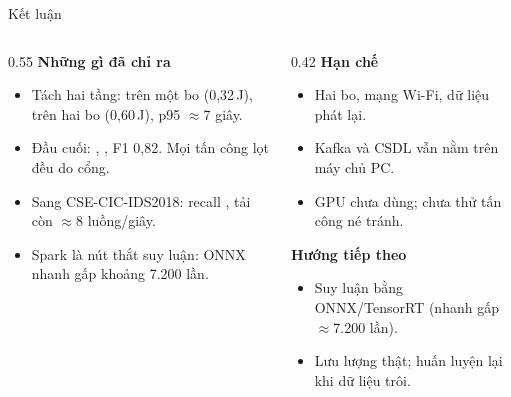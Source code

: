 \documentclass[aspectratio=169, 11pt]{beamer}
\begin{document}
\begin{frame}{Kết luận}
  \begin{columns}[T]
    \begin{column}{0.55\textwidth}
      \textbf{Những gì đã chỉ ra}
      \begin{itemize}\small
        \setlength{\itemsep}{0.3em}
        \item Tách hai tầng:  trên một bo
              (0,32\,J),  trên hai bo (0,60\,J), p95 $\approx$7 giây.
        \item Đầu cuối: , , F1 0,82.
              Mọi tấn công lọt đều do cổng.
        \item Sang CSE-CIC-IDS2018: recall , tải còn $\approx$8 luồng/giây.
        \item Spark là nút thắt suy luận: ONNX nhanh gấp khoảng 7.200 lần.
      \end{itemize}
    \end{column}
    \begin{column}{0.42\textwidth}
      \textbf{Hạn chế}
      \begin{itemize}\footnotesize
        \item Hai bo, mạng Wi-Fi, dữ liệu phát lại.
        \item Kafka và CSDL vẫn nằm trên máy chủ PC.
        \item GPU chưa dùng; chưa thử tấn công né tránh.
      \end{itemize}
      \textbf{Hướng tiếp theo}
      \begin{itemize}\footnotesize
        \item Suy luận bằng ONNX/TensorRT (nhanh gấp $\approx$7.200 lần).
        \item Lưu lượng thật; huấn luyện lại khi dữ liệu trôi.
      \end{itemize}
    \end{column}
  \end{columns}
  \vfill
  \centering {}
\end{frame}
\end{document}
